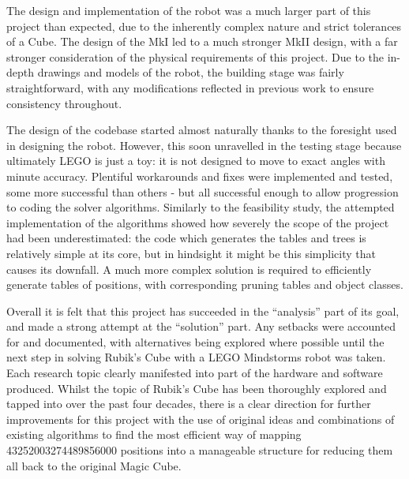 \documentclass{report}
\newcommand{\lego}{LEGO }
\begin{document}
    The design and implementation of the robot was a much larger part of this project than expected, due to the inherently complex nature and strict tolerances of a Cube. The design of the MkI led to a much stronger MkII design, with a far stronger consideration of the physical requirements of this project. Due to the in-depth drawings and models of the robot, the building stage was fairly straightforward, with any modifications reflected in previous work to ensure consistency throughout.
    
    The design of the codebase started almost naturally thanks to the foresight used in designing the robot. However, this soon unravelled in the testing stage because ultimately \lego is just a toy: it is not designed to move to exact angles with minute accuracy. Plentiful workarounds and fixes were implemented and tested, some more successful than others - but all successful enough to allow progression to coding the solver algorithms. Similarly to the feasibility study, the attempted implementation of the algorithms showed how severely the scope of the project had been underestimated: the code which generates the tables and trees is relatively simple at its core, but in hindsight it might be this simplicity that causes its downfall. A much more complex solution is required to efficiently generate tables of positions, with corresponding pruning tables and object classes.
    
   Overall it is felt that this project has succeeded in the \enquote{analysis} part of its goal, and made a strong attempt at the \enquote{solution} part. Any setbacks were accounted for and documented, with alternatives being explored where possible until the next step in solving Rubik's Cube with a \lego Mindstorms robot was taken. Each research topic clearly manifested into part of the hardware and software produced. Whilst the topic of Rubik's Cube has been thoroughly explored and tapped into over the past four decades, there is a clear direction for further improvements for this project with the use of original ideas and combinations of existing algorithms to find the most efficient way of mapping \num{43252003274489856000} positions into a manageable structure for reducing them all back to the original Magic Cube.
    
    
    \newpage
    \printbibliography
    
\end{document}

